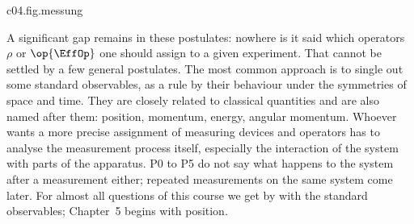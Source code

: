 \begin{tpcfigure}{c04.fig.messung}
  \caption{What the postulates P2, P4 and P5 fix together, for a qubit with
    $\op{\Ham} = \varepsilon\,\pauli{x}$ and the Z measurement $\op{\EffOp} = \ketbra{0}{0}$. (a) The
    states~\eqref{c04.eq.qubit} with $\real x = 0$: positivity, Equation~\eqref{c04.eq.det}, cuts
    out a disc of radius $\tfrac12$ about $\Id/2$; outside it (hatched) lie Hermitian matrices with
    trace one that are not states. The boundary consists of the pure states. $\op{U}_t$ rotates the
    disc about its centre, Equation~\eqref{c04.eq.kreis}; the circles are the orbits of the pure
    state $\ketbra{0}{0}$ (solid) and of a mixed state $\rho$ with $r = \tfrac{3}{10}$ (dotted).
    (b) The detection probability $\tr(\rho_t\op{\EffOp}) = p_t$ against time, in units of
    $\hbar/\varepsilon$: the distance $r$ from the centre in (a) is the amplitude in (b). The pure
    state oscillates between $0$ and $1$, Equation~\eqref{c04.eq.rabi}; the maximally mixed state
    $\Id/2$ always answers with $\tfrac12$ (horizontal line).}
\end{tpcfigure}

A significant gap remains in these postulates: nowhere is it said which operators $\rho$ or
$\op{\EffOp}$ one should assign to a given experiment. That cannot be settled by a few general
postulates. The most common approach is to single out some standard observables, as a rule by
their behaviour under the symmetries of space and time. They are closely related to classical
quantities and are also named after them: position, momentum, energy, angular momentum. Whoever
wants a more precise assignment of measuring devices and operators has to analyse the measurement
process itself, especially the interaction of the system with parts of the apparatus. P0 to P5 do
not say what happens to the system after a measurement either; repeated measurements on the same
system come later. For almost all questions of this course we get by with the standard
observables; Chapter~5 begins with position.
